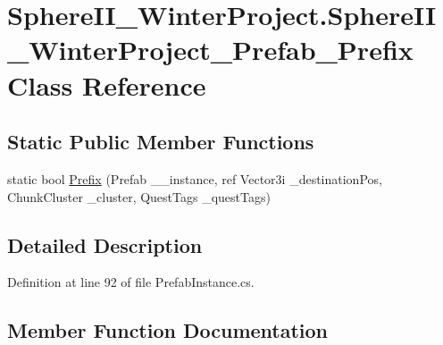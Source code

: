 \hypertarget{class_sphere_i_i___winter_project_1_1_sphere_i_i___winter_project___prefab___prefix}{}\section{Sphere\+I\+I\+\_\+\+Winter\+Project.\+Sphere\+I\+I\+\_\+\+Winter\+Project\+\_\+\+Prefab\+\_\+\+Prefix Class Reference}
\label{class_sphere_i_i___winter_project_1_1_sphere_i_i___winter_project___prefab___prefix}
\subsection*{Static Public Member Functions}
\begin{DoxyCompactItemize}
\item 
static bool \mbox{\hyperlink{class_sphere_i_i___winter_project_1_1_sphere_i_i___winter_project___prefab___prefix_ad5d4660fd7f0ff4a9ffb76bc63318fc7}{Prefix}} (Prefab \+\_\+\+\_\+instance, ref Vector3i \+\_\+destination\+Pos, Chunk\+Cluster \+\_\+cluster, Quest\+Tags \+\_\+quest\+Tags)
\end{DoxyCompactItemize}


\subsection{Detailed Description}


Definition at line 92 of file Prefab\+Instance.\+cs.



\subsection{Member Function Documentation}
\mbox{\label{class_sphere_i_i___winter_project_1_1_sphere_i_i___winter_project___prefab___prefix_ad5d4660fd7f0ff4a9ffb76bc63318fc7}} 
